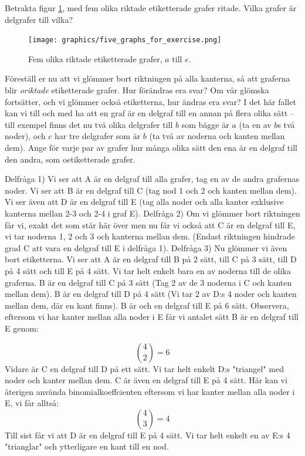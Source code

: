\documentclass[nobib]{tufte-handout}
\begin{document}
\newpage
\begin{xca}
    Betrakta figur \ref{fig:five_graphs_for_exercise}, med fem olika riktade etiketterade grafer ritade. Vilka grafer är delgrafer till vilka?

    \begin{figure}
        \centering
        \texttt{[image: graphics/five\_graphs\_for\_exercise.png]}
        \caption{Fem olika riktade etiketterade grafer, $a$ till $e$.}
        \label{fig:five_graphs_for_exercise}
    \end{figure}

    Föreställ er nu att vi glömmer bort riktningen på alla kanterna, så att graferna blir \emph{oriktade} etiketterade grafer. Hur förändras era svar? Om vår glömska fortsätter, och vi glömmer också etiketterna, hur ändras era svar? I det här fallet kan vi till och med ha att en graf är en delgraf till en annan på flera olika sätt -- till exempel finns det nu två olika delgrafer till $b$ som bägge är $a$ (ta en av $b$s två noder), och $c$ har tre delgrafer som är $b$ (ta två av noderna och kanten mellan dem). Ange för varje par av grafer hur många olika sätt den ena är en delgraf till den andra, som oetiketterade grafer.
\end{xca}
\begin{solution}
    

    
    
    Delfråga 1) Vi ser att A är en delgraf till alla grafer, tag en av de andra grafernas noder. Vi ser att B är en delgraf till C (tag nod 1 och 2 och kanten mellan dem). Vi ser även att D är en delgraf till E (tag alla noder och alla kanter exklusive kanterna mellan 2-3 och 2-4 i graf E). 
    Delfråga 2) Om vi glömmer bort riktningen får vi, exakt det som står här över men nu får vi också att C är en delgraf till E, vi tar noderna 1, 2 och 3 och kanterna mellan dem. (Endast riktningen hindrade grad C att vara en delgraf till E i delfråga 1). 
    Delfråga 3) Nu glömmer vi även bort etiketterna. Vi ser att A är en delgraf till B på 2 sätt, till C på 3 sätt, till D på 4 sätt och till E på 4 sätt. Vi tar helt enkelt bara en av noderna till de olika graferna. B är en delgraf till C på 3 sätt (Tag 2 av de 3 noderna i C och kanten mellan dem). B är en delgraf till D på 4 sätt (Vi tar 2 av D:s 4 noder och kanten mellan dem, där en kant finns). B är och en delgraf till E på 6 sätt. Observera, eftersom vi har kanter mellan alla noder i E får vi antalet sätt B är en delgraf till E genom:

    $${\binom{4}{2}} = 6$$ Vidare är C en delgraf till D på ett sätt. Vi tar helt enkelt D:s "triangel" med noder och kanter mellan dem. C är även en delgraf till E på 4 sätt. Här kan vi återigen använda binomialkoeffcienten eftersom vi har kanter mellan alla noder i E, vi får alltså: $${\binom{4}{3}} = 4$$ Till sist får vi att D är en delgraf till E på 4 sätt. Vi tar helt enkelt en av E:s 4 "trianglar" och ytterligare en kant till en nod. 


\end{solution}
\end{document}
